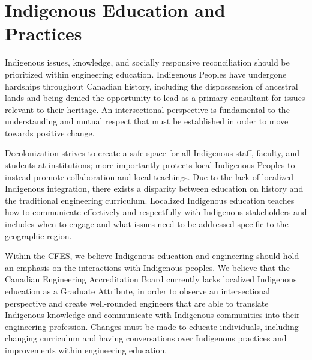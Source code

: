 \section{Indigenous Education and Practices}\label{indigenous-education-and-practices}




Indigenous issues, knowledge, and socially responsive reconciliation should be prioritized within engineering education. Indigenous Peoples have undergone hardships throughout Canadian history, including the dispossession of ancestral lands and being denied the opportunity to lead as a primary consultant for issues relevant to their heritage. An intersectional perspective is fundamental to the understanding and mutual respect that must be established in order to move towards positive change.

Decolonization strives to create a safe space for all Indigenous staff, faculty, and students at institutions; more importantly protects local Indigenous Peoples to instead promote collaboration and local teachings. Due to the lack of localized Indigenous integration, there exists a disparity between education on history and the traditional engineering curriculum. Localized Indigenous education teaches how to communicate effectively and respectfully with Indigenous stakeholders and includes when to engage and what issues need to be addressed specific to the geographic region.

Within the CFES, we believe Indigenous education and engineering should hold an emphasis on the interactions with Indigenous peoples. We believe that the Canadian Engineering Accreditation Board currently lacks localized Indigenous education as a Graduate Attribute, in order to observe an intersectional perspective and create well-rounded engineers that are able to translate Indigenous knowledge and communicate with Indigenous communities into their engineering profession. Changes must be made to educate individuals, including changing curriculum and having conversations over Indigenous practices and improvements within engineering education.

